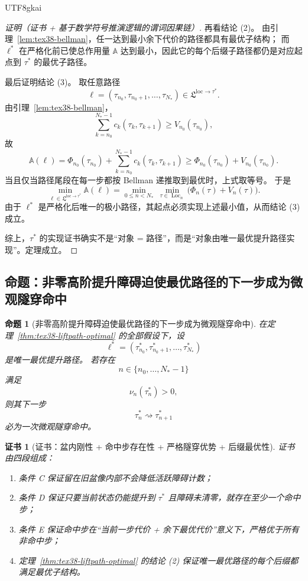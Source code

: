 \documentclass[12pt]{article}
\newtheorem{proposition}{命题}[section]
\newtheorem{Certificate}{证书}[section]
\begin{document}
\begin{CJK*}{UTF8}{gkai}
\begin{proof}[证明（证书 + 基于数学符号推演逻辑的谓词因果链）]
再看结论 (2)。
由引理~\ref{lem:tex38-bellman}，任一达到最小余下代价的路径都具有最优子结构；
而 $\ell^\ast$ 在严格化前已使总作用量 $\mathbb A$ 达到最小，因此它的每个后缀子路径都仍是对应起点到 $\tau^\ast$ 的最优子路径。

最后证明结论 (3)。
取任意路径
\[
  \ell=(\tau_{n_0},\tau_{n_0+1},\dots,\tau_{N_\ast})
  \in
  \mathfrak L^{\mathrm{loc}\to\tau^\ast}.
\]
由引理~\ref{lem:tex38-bellman}，
\[
  \sum_{k=n_0}^{N_\ast-1}c_k(\tau_k,\tau_{k+1})
  \ge
  V_{n_0}(\tau_{n_0}),
\]
故
\[
  \mathbb A(\ell)
  =
  \Phi_{n_0}(\tau_{n_0})
  +
  \sum_{k=n_0}^{N_\ast-1}c_k(\tau_k,\tau_{k+1})
  \ge
  \Phi_{n_0}(\tau_{n_0})+V_{n_0}(\tau_{n_0}).
\]
当且仅当路径尾段在每一步都按 Bellman 递推取到最优时，上式取等号。
于是
\[
  \min_{\ell\in\mathfrak L^{\mathrm{loc}\to\tau^\ast}}\mathbb A(\ell)
  =
  \min_{0\le n<N_\ast}\ \min_{\tau\in\operatorname{Loc}_n}
  \bigl(\Phi_n(\tau)+V_n(\tau)\bigr).
\]
由于 $\ell^\ast$ 是严格化后唯一的极小路径，其起点必须实现上述最小值，从而结论 (3) 成立。

综上，$\tau^\ast$ 的实现证书确实不是“对象 = 路径”，而是“对象由唯一最优提升路径实现”。定理成立。
\end{proof}

\subsection{命题：非零高阶提升障碍迫使最优路径的下一步成为微观隧穿命中}
\label{subsec:tex38-microhit-necessary}

\begin{proposition}[非零高阶提升障碍迫使最优路径的下一步成为微观隧穿命中]
\label{prop:tex38-microhit-necessary}
在定理~\ref{thm:tex38-liftpath-optimal} 的全部假设下，设
\[
  \ell^\ast=(\tau_{n_0}^\ast,\tau_{n_0+1}^\ast,\dots,\tau_{N_\ast}^\ast)
\]
是唯一最优提升路径。
若存在
\[
  n\in\{n_0,\dots,N_\ast-1\}
\]
满足
\[
  \nu_n(\tau_n^\ast)>0,
\]
则其下一步
\[
  \tau_n^\ast\rightsquigarrow\tau_{n+1}^\ast
\]
必为一次微观隧穿命中。
\end{proposition}

\begin{Certificate}[证书：盆内刚性 + 命中步存在性 + 严格隧穿优势 + 后缀最优性]
\label{cert:tex38-microhit-necessary}
证书由四段组成：
\begin{enumerate}
  \item 条件 C 保证留在旧盆像内部不会降低活跃障碍计数；
  \item 条件 D 保证只要当前状态仍能提升到 $\tau^\ast$ 且障碍未清零，就存在至少一个命中步；
  \item 条件 E 保证命中步在“当前一步代价 + 余下最优代价”意义下，严格优于所有非命中步；
  \item 定理~\ref{thm:tex38-liftpath-optimal} 的结论 (2) 保证唯一最优路径的每个后缀都满足最优子结构。
\end{enumerate}
\end{Certificate}


\end{CJK*}
\end{document}
